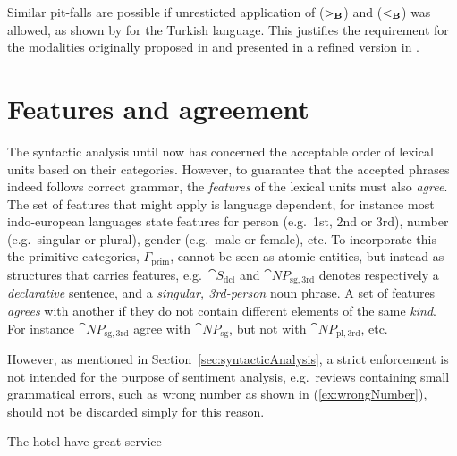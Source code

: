 Similar pit-falls are possible if unresticted application of ($>_{\bf B}$) and ($<_{\bf B}$) was allowed, as shown by \citeauthor{baldridgeThesis}  for the Turkish language. This justifies the requirement for the modalities \citeauthor{baldridgeThesis} originally proposed in  and \citeauthor{multiModalCCG} presented in a refined version in .

\section{Features and agreement}
\label{sec:featuresAgreement}

The syntactic analysis until now has concerned the acceptable order of lexical units based on their categories. However, to guarantee that the accepted phrases indeed follows correct grammar, the \emph{features} of the lexical units must also \emph{agree}. The set of features that might apply is language dependent, for instance most indo-european languages state features for person (e.g.\ 1st, 2nd or 3rd), number (e.g.\ singular or plural), gender (e.g.\ male or female), etc. To incorporate this the primitive categories, $\Gamma_\mathrm{prim}$, cannot be seen as atomic entities, but instead as structures that carries features, e.g.\ $\cat{S_\mathrm{dcl}}$ and $\cat{NP}_\mathrm{sg,3rd}$ denotes respectively a \emph{declarative} sentence, and a \emph{singular, 3rd-person} noun phrase. A set of features \emph{agrees} with another if they do not contain different elements of the same \emph{kind}. For instance $\cat{NP}_\mathrm{sg,3rd}$ agree with $\cat{NP}_\mathrm{sg}$, but not with $\cat{NP}_\mathrm{pl,3rd}$, etc.

However, as mentioned in Section~\ref{sec:syntacticAnalysis}, a strict enforcement is not intended for the purpose of sentiment analysis, e.g.\ reviews containing small grammatical errors, such as wrong number as shown in (\ref{ex:wrongNumber}), should not be discarded simply for this reason. 

\begin{numquote}
  The hotel have great service
  \label{ex:wrongNumber}
\end{numquote}

